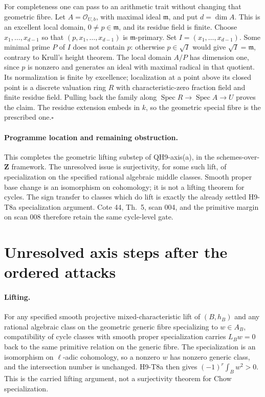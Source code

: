 \documentclass[11pt]{article}
\theoremstyle{remark}\newtheorem{remark}[theorem]{Remark}
\begin{document}
For completeness one can pass to an arithmetic trait without
changing that geometric fibre. Let $A=\mathcal O_{U,b}$, with
maximal ideal $\mathfrak m$, and put $d=\dim A$. This is an
excellent local domain, $0\ne p\in\mathfrak m$, and its residue
field is finite. Choose $x_1,\ldots,x_{d-1}$ so that
$(p,x_1,\ldots,x_{d-1})$ is $\mathfrak m$-primary. Set
$I=(x_1,\ldots,x_{d-1})$. Some minimal prime $P$ of $I$ does
not contain $p$: otherwise $p\in\sqrt I$ would give
$\sqrt I=\mathfrak m$, contrary to Krull's height theorem.
The local domain $A/P$ has dimension one, since $p$ is nonzero
and generates an ideal with maximal radical in that quotient.
Its normalization is finite by excellence; localization at a
point above its closed point is a discrete valuation ring $R$
with characteristic-zero fraction field and finite residue field.
Pulling back the family along
$\operatorname{Spec}R\to\operatorname{Spec}A\to U$ proves the
claim. The residue extension embeds in $k$, so the geometric
special fibre is the prescribed one.\hfill$\square$

\paragraph{Programme location and remaining obstruction.}
This completes the geometric lifting substep of QH9-axis(a),
in the schemes-over-$\mathbf Z$ framework. The unresolved issue
is surjectivity, for some such lift, of specialization on the
specified rational algebraic middle classes. Smooth proper base
change is an isomorphism on cohomology; it is not a lifting
theorem for cycles. The sign transfer to classes which do lift
is exactly the already settled H9-T8a specialization argument.
Cote 44, Th.~5, scan 004, and the primitive margin on scan 008
therefore retain the same cycle-level gate.

\section{Unresolved axis steps after the ordered attacks}

\paragraph{Lifting.}
For any specified smooth projective mixed-characteristic lift
of $(B,h_B)$ and any rational algebraic class on the geometric
generic fibre specializing to $w\in A_B$, compatibility of
cycle classes with smooth proper specialization carries
$L_Bw=0$ back to the same primitive relation on the generic
fibre. The specialization is an isomorphism on $\ell$-adic
cohomology, so a nonzero $w$ has nonzero generic class, and the
intersection number is unchanged. H9-T8a then gives
$(-1)^r\int_Bw^2>0$. This is the carried lifting argument,
not a surjectivity theorem for Chow specialization.
\end{document}

